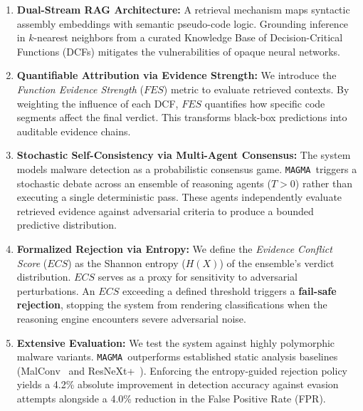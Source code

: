 \documentclass[pdflatex,sn-mathphys-num]{sn-jnl}
\newcommand{\sysname}{\texttt{MAGMA}~}
\begin{document}
\begin{enumerate}
    \item \textbf{Dual-Stream RAG Architecture:} A retrieval mechanism maps syntactic assembly embeddings with semantic pseudo-code logic. Grounding inference in $k$-nearest neighbors from a curated Knowledge Base of Decision-Critical Functions (DCFs) mitigates the vulnerabilities of opaque neural networks.

    \item \textbf{Quantifiable Attribution via Evidence Strength:} We introduce the \textit{Function Evidence Strength} ($FES$) metric to evaluate retrieved contexts. By weighting the influence of each DCF, $FES$ quantifies how specific code segments affect the final verdict. This transforms black-box predictions into auditable evidence chains.

    \item \textbf{Stochastic Self-Consistency via Multi-Agent Consensus:} The system models malware detection as a probabilistic consensus game. \sysname triggers a stochastic debate across an ensemble of reasoning agents ($T > 0$) rather than executing a single deterministic pass. These agents independently evaluate retrieved evidence against adversarial criteria to produce a bounded predictive distribution.

    \item \textbf{Formalized Rejection via Entropy:} We define the \textit{Evidence Conflict Score} ($ECS$) as the Shannon entropy ($H(X)$) of the ensemble's verdict distribution. $ECS$ serves as a proxy for sensitivity to adversarial perturbations. An $ECS$ exceeding a defined threshold triggers a \textbf{fail-safe rejection}, stopping the system from rendering classifications when the reasoning engine encounters severe adversarial noise.

    \item \textbf{Extensive Evaluation:} We test the system against highly polymorphic malware variants. \sysname outperforms established static analysis baselines (MalConv~\cite{RaffEdward2018Malware} and ResNeXt+~\cite{HeYuewang2024ResNeXt}). Enforcing the entropy-guided rejection policy yields a 4.2\% absolute improvement in detection accuracy against evasion attempts alongside a 4.0\% reduction in the False Positive Rate (FPR).
\end{enumerate}

\end{document}
